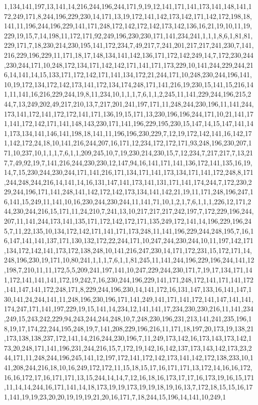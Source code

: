 1,134,141,197,13,141,14,216,244,196,244,171,9,19,12,141,171,141,173,141,148,141,172,249,171,8,244,196,229,230,14,171,13,19,172,141,142,173,142,171,142,172,198,18,141,11,196,244,196,229,141,171,248,172,142,172,142,173,142,136,16,21,19,10,11,19,229,19,15,7,14,198,11,172,171,92,249,196,230,230,171,141,234,241,1,1,1,8,6,1,81,81,229,171,7,18,230,214,230,195,141,172,234,7,49,217,7,241,201,217,217,241,230,7,141,216,229,196,229,11,171,18,17,148,134,141,142,136,171,172,142,249,14,7,172,230,244,230,244,171,10,248,172,134,171,142,142,171,141,171,173,229,10,141,244,229,244,216,14,141,14,15,133,171,172,142,171,141,134,172,21,244,171,10,248,230,244,196,141,10,19,172,134,172,142,173,141,172,134,174,248,171,141,216,19,230,15,141,15,216,141,11,141,16,216,229,244,19,8,11,234,10,1,1,1,7,6,1,1,2,245,11,141,229,244,196,215,244,7,13,249,202,49,217,210,13,7,217,201,241,197,171,11,248,244,230,196,11,141,244,173,141,172,141,172,172,141,171,136,19,15,171,13,230,196,196,244,171,10,21,141,171,141,172,142,171,141,148,143,230,171,141,196,229,195,230,15,147,14,15,147,141,141,173,134,141,146,141,198,18,141,11,196,196,230,229,7,12,19,172,142,141,16,142,171,142,172,24,18,10,141,216,244,207,16,171,12,234,172,172,171,93,248,196,230,207,171,10,237,10,1,1,1,7,6,1,1,209,245,10,7,19,230,214,230,15,7,12,234,7,217,217,7,13,217,7,49,92,19,7,141,216,244,230,230,12,147,94,16,141,171,141,136,172,141,135,16,19,14,7,15,230,244,230,244,171,141,216,171,134,171,141,173,134,171,141,172,248,8,171,244,248,244,216,14,141,14,16,131,147,141,173,141,131,171,141,174,244,7,172,230,229,244,196,171,141,248,141,142,172,142,173,134,141,142,21,19,11,171,248,196,247,16,141,15,249,11,141,10,16,230,244,230,244,11,141,71,10,1,2,1,7,6,1,1,1,226,12,171,244,230,244,216,15,171,11,24,210,7,241,13,10,217,217,217,242,197,7,172,229,196,244,207,11,141,244,173,141,135,171,172,142,172,171,135,249,172,141,14,196,229,196,245,7,11,22,135,10,134,172,142,171,141,171,173,248,11,141,196,229,244,248,195,7,16,16,147,141,141,137,171,130,132,172,22,244,171,10,247,244,230,244,10,11,197,142,171,134,172,142,141,173,172,138,248,10,141,216,247,230,14,171,172,231,15,172,171,14,248,196,230,19,171,10,80,241,1,1,1,7,6,1,1,81,245,11,141,244,196,229,196,244,141,12,198,7,210,11,11,172,5,5,209,241,197,141,10,247,229,244,230,171,7,19,17,134,171,141,172,141,141,141,172,19,242,7,16,230,244,196,229,141,171,248,172,141,171,141,172,141,147,141,172,248,171,8,229,244,196,230,14,141,172,16,131,147,133,16,141,147,130,141,24,244,141,11,248,196,230,196,171,141,249,141,171,141,172,141,147,141,141,174,247,171,141,197,229,19,15,141,14,234,12,141,141,17,234,230,230,216,11,141,234,249,15,243,242,229,94,243,244,244,248,10,7,248,230,196,231,213,141,241,235,196,18,19,17,174,22,244,195,248,19,7,141,208,229,196,216,11,171,18,197,20,173,19,138,21,173,138,138,237,172,141,14,216,244,230,196,7,11,249,173,142,16,173,143,173,142,173,20,248,171,141,196,231,244,216,15,7,172,19,142,16,142,137,173,143,142,173,23,244,171,11,248,244,196,245,141,12,197,172,141,172,142,173,141,142,172,138,233,10,141,208,244,216,18,10,16,249,172,172,11,15,18,15,17,16,171,171,13,172,14,16,16,172,16,16,172,17,16,171,171,13,15,244,14,14,7,12,16,18,16,173,17,17,16,173,19,16,15,171,11,14,14,244,16,171,141,14,18,173,19,19,173,19,19,18,19,16,13,7,172,18,15,15,16,171,141,19,19,23,20,20,19,19,19,21,20,16,171,7,18,244,15,196,14,141,10,249,1